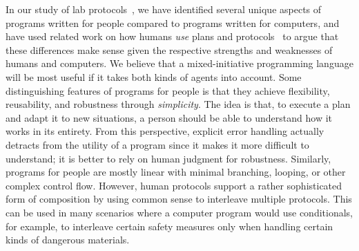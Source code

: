 \documentclass{sig-alternate-05-2015}
\begin{document}
In our study of lab protocols~\cite{abbott2015prog}, we have identified several
unique aspects of programs written for people compared to programs written for
computers, and have used related work on how humans \emph{use} plans and
protocols~\cite{Suchman1987,Lynch2002} to argue that these differences make
sense given the respective strengths and weaknesses of humans and computers.
%
We believe that a mixed-initiative programming language will be most useful if
it takes both kinds of agents into account.
%
Some distinguishing features of programs for people is that they achieve
flexibility, reusability, and robustness through \emph{simplicity}. The idea is
that, to execute a plan and adapt it to new situations, a person should be able
to understand how it works in its entirety. From this perspective, explicit
error handling actually detracts from the utility of a program since it makes
it more difficult to understand; it is better to rely on human judgment for
robustness. Similarly, programs for people are mostly linear with minimal
branching, looping, or other complex control flow.
%
However, human protocols support a rather sophisticated form of composition by
using common sense to interleave multiple protocols. This can be used in many
scenarios where a computer program would use conditionals, for example, to
interleave certain safety measures only when handling certain kinds of
dangerous materials.


\end{document}

